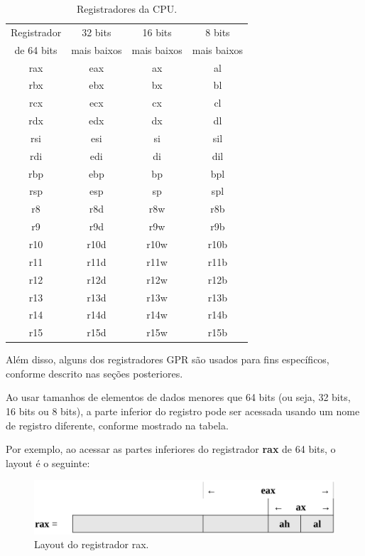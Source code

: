\begin{table}[h]
	\centering
	\begin{tabular}{|c|c|c|c|}
		\hline
		\rowcolor[HTML]{C0C0C0} 
		Registrador & 32 bits & 16 bits & 8 bits \\ 
		\rowcolor[HTML]{C0C0C0} 
		de 64 bits & mais baixos & mais baixos & mais baixos \\ \hline
		rax & eax& ax & al\\ \hline
		rbx & ebx& bx & bl\\ \hline
		rcx & ecx& cx & cl\\ \hline
		rdx & edx& dx & dl\\ \hline
		rsi & esi& si & sil\\ \hline
		rdi & edi& di & dil\\ \hline
		rbp & ebp& bp & bpl\\ \hline
		rsp & esp& sp & spl\\ \hline
		r8 & r8d& r8w & r8b\\ \hline
		r9 & r9d& r9w & r9b\\ \hline
		r10 & r10d& r10w & r10b\\ \hline
		r11 & r11d& r11w & r11b\\ \hline
		r12 & r12d& r12w & r12b\\ \hline
		r13 & r13d& r13w & r13b\\ \hline
		r14 & r14d& r14w & r14b\\ \hline
		r15 & r15d& r15w & r15b\\ \hline
	\end{tabular}
	
	\caption{Registradores da CPU.}
	\label{tab:registradores}
\end{table}

Além disso, alguns dos registradores GPR são usados para fins específicos, conforme descrito nas seções posteriores.

Ao usar tamanhos de elementos de dados menores que 64 bits (ou seja, 32 bits, 16 bits ou 8 bits), a parte inferior do registro pode ser acessada usando um nome de registro diferente, conforme mostrado na tabela.

Por exemplo, ao acessar as partes inferiores do registrador \textbf{rax} de 64 bits, o layout é o seguinte:

\begin{figure}[ht]
	\includegraphics[width=0.8\linewidth]{imagens/layoutrax}
	\caption{Layout do registrador rax.}
	\label{layoutrax}
\end{figure}

